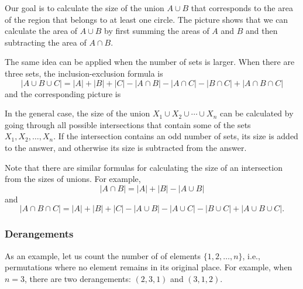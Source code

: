 Our goal is to calculate
the size of the union $A \cup B$
that corresponds to the area of the region
that belongs to at least one circle.
The picture shows that we can calculate
the area of $A \cup B$ by first summing the
areas of $A$ and $B$ and then subtracting
the area of $A \cap B$.

The same idea can be applied when the number
of sets is larger.
When there are three sets, the inclusion-exclusion formula is
\[ |A \cup B \cup C| = |A| + |B| + |C| - |A \cap B|  - |A \cap C|  - |B \cap C| + |A \cap B \cap C| \]
and the corresponding picture is

\begin{center}
\end{center}

In the general case, the size of the
union $X_1 \cup X_2 \cup \cdots \cup X_n$
can be calculated by going through all possible
intersections that contain some of the sets $X_1,X_2,\ldots,X_n$.
If the intersection contains an odd number of sets,
its size is added to the answer,
and otherwise its size is subtracted from the answer.

Note that there are similar formulas
for calculating
the size of an intersection from the sizes of
unions. For example,
\[ |A \cap B| = |A| + |B| - |A \cup B|\]
and
\[ |A \cap B \cap C| = |A| + |B| + |C| - |A \cup B|  - |A \cup C|  - |B \cup C| + |A \cup B \cup C| .\]

\subsubsection{Derangements}


As an example, let us count the number of 
of elements $\{1,2,\ldots,n\}$, i.e., permutations
where no element remains in its original place.
For example, when $n=3$, there are
two derangements: $(2,3,1)$ and $(3,1,2)$.

